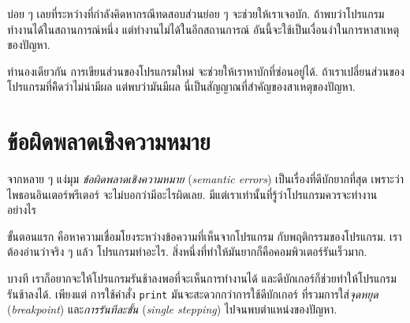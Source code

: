 บ่อย ๆ เลยที่ระหว่างที่กำลังคิดหากรณีทดสอบส่วนย่อย ๆ จะช่วยให้เราเจอบัก.
ถ้าพบว่าโปรแกรมทำงานได้ในสถานการณ์หนึ่ง
แต่ทำงานไม่ได้ในอีกสถานการณ์ 
อันนี้จะใช้เป็นเงื่อนงำในการหาสาเหตุของปัญหา.


ทำนองเดียวกัน
การเขียนส่วนของโปรแกรมใหม่
จะช่วยให้เราหาบักที่ซ่อนอยู่ได้.
ถ้าเราเปลี่ยนส่วนของโปรแกรมที่คิิดว่าไม่น่ามีผล
แต่พบว่ามันมีผล
นี่เป็นสัญญาณที่สำคัญของสาเหตุของปัญหา.


\section{ข้อผิดพลาดเชิงความหมาย}


จากหลาย ๆ แง่มุม
\textit{ข้อผิดพลาดเชิงความหมาย} (\textit{semantic errors})
เป็นเรื่องที่ดีบักยากที่สุด
เพราะว่า 
ไพธอนอินเตอร์พรีเตอร์ จะไม่บอกว่ามีอะไรผิดเลย.
มีแต่เราเท่านั้นที่รู้ว่าโปรแกรมควรจะทำงานอย่างไร



ขั้นตอนแรก คือหาความเชื่อมโยงระหว่างข้อความที่เห็นจากโปรแกรม กับพฤติกรรมของโปรแกรม.
เราต้องอ่านว่าจริง ๆ แล้ว โปรแกรมทำอะไร.
สิ่งหนึ่งที่ทำให้มันยากก็คือคอมพิวเตอร์รันเร็วมาก.


บางที เราก็อยากจะให้โปรแกรมรันช้าลงพอที่จะเห็นการทำงานได้
และดีบักเกอร์ก็ช่วยทำให้โปรแกรมรันช้าลงได้.
เพียงแต่ การใช้คำสั่ง \texttt{print}
มันจะสะดวกกว่าการใช้ดีบักเกอร์
ที่รวมการใส่\textit{จุดหยุด} (\textit{breakpoint})
และ\textit{การรันทีละขั้น} (\textit{single stepping}) ไปจนพบตำแหน่งของปัญหา.

